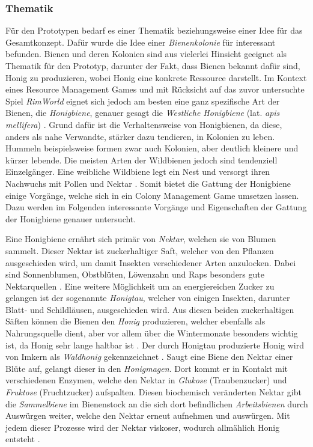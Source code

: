 \subsubsection{Thematik}
Für den Prototypen bedarf es einer Thematik beziehungsweise einer Idee für das Gesamtkonzept. Dafür wurde die Idee einer \textit{Bienenkolonie} für interessant befunden. Bienen und deren Kolonien sind aus vielerlei Hinsicht geeignet als Thematik für den Prototyp, darunter der Fakt, dass Bienen bekannt dafür sind, Honig zu produzieren, wobei Honig eine konkrete Ressource darstellt. Im Kontext eines Resource Management Games und mit Rücksicht auf das zuvor untersuchte Spiel \textit{RimWorld} eignet sich jedoch am besten eine ganz spezifische Art der Bienen, die \textit{Honigbiene}, genauer gesagt die \textit{Westliche Honigbiene} (lat. \textit{apis mellifera}) \cite*[]{bees:name}. Grund dafür ist die Verhaltensweise von Honigbienen, da diese, anders als nahe Verwandte, stärker dazu tendieren, in Kolonien zu leben. Hummeln beispielsweise formen zwar auch Kolonien, aber deutlich kleinere und kürzer lebende. Die meisten Arten der Wildbienen jedoch sind tendenziell Einzelgänger. Eine weibliche Wildbiene legt ein Nest und versorgt ihren Nachwuchs mit Pollen und Nektar \cite*[]{bees:wild}. Somit bietet die Gattung der Honigbiene einige Vorgänge, welche sich in ein Colony Management Game umsetzen lassen. Dazu werden im Folgenden interessante Vorgänge und Eigenschaften der Gattung der Honigbiene genauer untersucht.

Eine Honigbiene ernährt sich primär von \textit{Nektar}, welchen sie von Blumen sammelt. Dieser Nektar ist zuckerhaltiger Saft, welcher von den Pflanzen ausgeschieden wird, um damit Insekten verschiedener Arten anzulocken. Dabei sind Sonnenblumen, Obstblüten, Löwenzahn und Raps besonders gute Nektarquellen \cite*[]{bees:food}. Eine weitere Möglichkeit um an energiereichen Zucker zu gelangen ist der sogenannte \textit{Honigtau}, welcher von einigen Insekten, darunter Blatt- und Schildläusen, ausgeschieden wird. Aus diesen beiden zuckerhaltigen Säften können die Bienen den \textit{Honig} produzieren, welcher ebenfalls als Nahrungsquelle dient, aber vor allem über die Wintermonate besonders wichtig ist, da Honig sehr lange haltbar ist \cite*[]{bees:honeywinter}. Der durch Honigtau produzierte Honig wird von Imkern als \textit{Waldhonig} gekennzeichnet \cite*[]{bees:food}. Saugt eine Biene den Nektar einer Blüte auf, gelangt dieser in den \textit{Honigmagen}. Dort kommt er in Kontakt mit verschiedenen Enzymen, welche den Nektar in \textit{Glukose} (Traubenzucker) und \textit{Fruktose} (Fruchtzucker) \cite*[]{bees:glucosefructose} aufspalten. Diesen biochemisch veränderten Nektar gibt die \textit{Sammelbiene} im Bienenstock an die sich dort befindlichen \textit{Arbeitsbienen} durch Auswürgen weiter, welche den Nektar erneut aufnehmen und auswürgen. Mit jedem dieser Prozesse wird der Nektar viskoser, wodurch allmählich Honig entsteht \cite*[]{bees:nectartohoney}.

